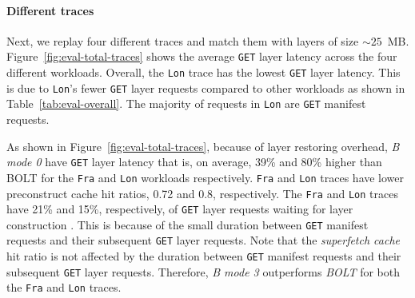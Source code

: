 \paragraph{Different traces}
Next, we replay four different traces and match them with layers of size $\sim25$~MB.
Figure~\ref{fig:eval-total-traces} shows the average \texttt{GET} layer latency across the four different workloads.
Overall, the \texttt{Lon} trace has the lowest \texttt{GET} layer latency.
This is due to \texttt{Lon}'s fewer \texttt{GET} layer requests compared to other workloads as shown in Table~\ref{tab:eval-overall}.
The majority of requests in \texttt{Lon} are \texttt{GET} manifest requests.

As shown in Figure~\ref{fig:eval-total-traces}, because of layer restoring overhead, \emph{B mode 0} have \texttt{GET} layer latency that is, on average, 39\% and 80\% higher than BOLT for the \texttt{Fra} and \texttt{Lon} workloads respectively.
\texttt{Fra} and \texttt{Lon} traces have lower preconstruct cache hit ratios, 0.72 and 0.8, respectively. 
The \texttt{Fra} and \texttt{Lon} traces have 21\% and 15\%, respectively, of \texttt{GET} layer requests waiting for layer construction . 
This is because of the small duration between \texttt{GET} manifest requests and their subsequent \texttt{GET} layer requests.
Note that the \emph{superfetch cache} hit ratio is
not affected by the duration between \texttt{GET} manifest requests and their subsequent \texttt{GET} layer requests.
Therefore, \emph{B mode 3} outperforms \emph{BOLT} for both the \texttt{Fra} and \texttt{Lon} traces. 


